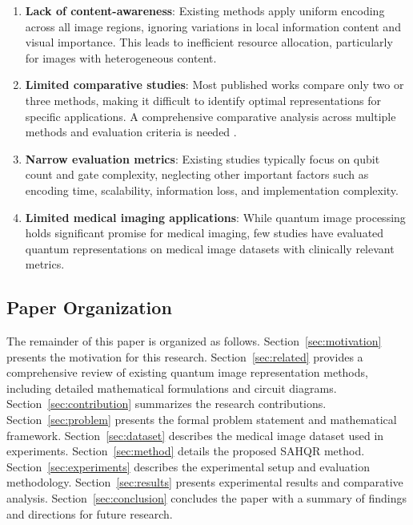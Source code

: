 \documentclass[pdflatex,sn-mathphys-num,Numbered]{sn-jnl}
\theoremstyle{thmstyleone}
\theoremstyle{thmstyletwo}
\theoremstyle{thmstylethree}
\begin{document}
\begin{enumerate}
\item \textbf{Lack of content-awareness}: Existing methods apply uniform encoding across all image regions, ignoring variations in local information content and visual importance. This leads to inefficient resource allocation, particularly for images with heterogeneous content.

\item \textbf{Limited comparative studies}: Most published works compare only two or three methods, making it difficult to identify optimal representations for specific applications. A comprehensive comparative analysis across multiple methods and evaluation criteria is needed \cite{bib42}.

\item \textbf{Narrow evaluation metrics}: Existing studies typically focus on qubit count and gate complexity, neglecting other important factors such as encoding time, scalability, information loss, and implementation complexity.

\item \textbf{Limited medical imaging applications}: While quantum image processing holds significant promise for medical imaging, few studies have evaluated quantum representations on medical image datasets with clinically relevant metrics.
\end{enumerate}

\subsection{Paper Organization}

The remainder of this paper is organized as follows. Section~\ref{sec:motivation} presents the motivation for this research. Section~\ref{sec:related} provides a comprehensive review of existing quantum image representation methods, including detailed mathematical formulations and circuit diagrams. Section~\ref{sec:contribution} summarizes the research contributions. Section~\ref{sec:problem} presents the formal problem statement and mathematical framework. Section~\ref{sec:dataset} describes the medical image dataset used in experiments. Section~\ref{sec:method} details the proposed SAHQR method. Section~\ref{sec:experiments} describes the experimental setup and evaluation methodology. Section~\ref{sec:results} presents experimental results and comparative analysis. Section~\ref{sec:conclusion} concludes the paper with a summary of findings and directions for future research.
\end{document}
